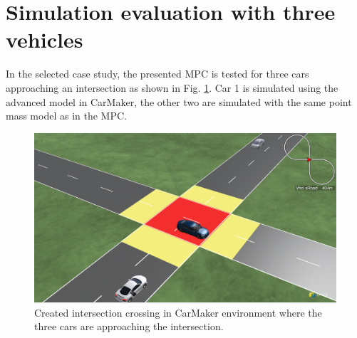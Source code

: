 \documentclass[letterpaper,10pt,conference]{ieeeconf}
\begin{document}
\section{Simulation evaluation with three vehicles} \label{sec:casestudy}
In the selected case study, the presented MPC is tested for three cars
approaching an intersection as shown in Fig. \ref{fig:CarM}. Car 1 is
simulated using the advanced model in CarMaker, the other two are
simulated with the same point mass model as in the MPC.
\begin{figure}
    \centering
    \includegraphics[width=0.9\columnwidth]{New_SimPic.png}
    \caption{Created intersection crossing in CarMaker environment where the three cars are approaching the intersection.}
    \label{fig:CarM}
\end{figure}
\end{document}

